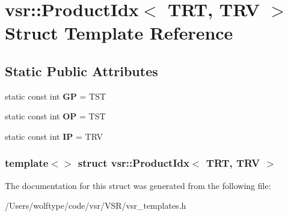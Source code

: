 \hypertarget{structvsr_1_1_product_idx_3_01_t_r_t_00_01_t_r_v_01_4}{\section{vsr\-:\-:Product\-Idx$<$ T\-R\-T, T\-R\-V $>$ Struct Template Reference}
\label{structvsr_1_1_product_idx_3_01_t_r_t_00_01_t_r_v_01_4}
}
\subsection*{Static Public Attributes}
\begin{DoxyCompactItemize}
\item 
\hypertarget{structvsr_1_1_product_idx_3_01_t_r_t_00_01_t_r_v_01_4_a09569d27a2e893de3a7590dcee687b45}{static const int {\bfseries G\-P} = T\-S\-T}\label{structvsr_1_1_product_idx_3_01_t_r_t_00_01_t_r_v_01_4_a09569d27a2e893de3a7590dcee687b45}

\item 
\hypertarget{structvsr_1_1_product_idx_3_01_t_r_t_00_01_t_r_v_01_4_a2b20220351a14ad8764067c677de0433}{static const int {\bfseries O\-P} = T\-S\-T}\label{structvsr_1_1_product_idx_3_01_t_r_t_00_01_t_r_v_01_4_a2b20220351a14ad8764067c677de0433}

\item 
\hypertarget{structvsr_1_1_product_idx_3_01_t_r_t_00_01_t_r_v_01_4_a42c4321a95f6dff160f4a590d7f41378}{static const int {\bfseries I\-P} = T\-R\-V}\label{structvsr_1_1_product_idx_3_01_t_r_t_00_01_t_r_v_01_4_a42c4321a95f6dff160f4a590d7f41378}

\end{DoxyCompactItemize}
\subsubsection*{template$<$$>$ struct vsr\-::\-Product\-Idx$<$ T\-R\-T, T\-R\-V $>$}



The documentation for this struct was generated from the following file\-:\begin{DoxyCompactItemize}
\item 
/\-Users/wolftype/code/vsr/\-V\-S\-R/vsr\-\_\-templates.\-h\end{DoxyCompactItemize}

